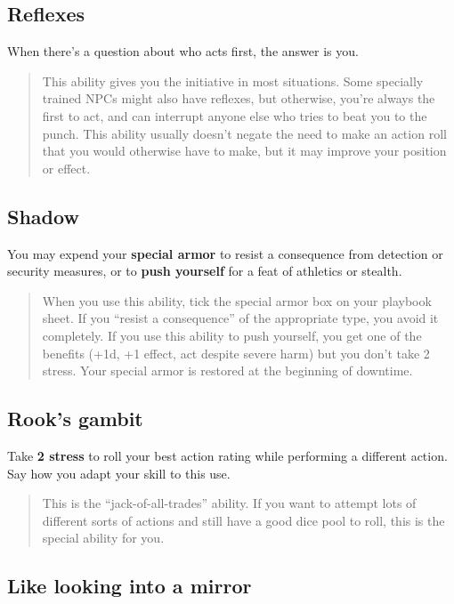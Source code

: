 \documentclass[11pt,oneside]{book}
\begin{document}
\subsection{Reflexes}

When there’s a question about who acts first, the answer is you.

\begin{quote}
	This ability gives you the initiative in most situations. Some specially trained NPCs might also have reflexes, but otherwise, you’re always the first to act, and can interrupt anyone else who tries to beat you to the punch. This ability usually doesn’t negate the need to make an action roll that you would otherwise have to make, but it may improve your position or effect.
\end{quote} 

\subsection{Shadow}

You may expend your \textbf{special armor} to resist a consequence from detection or security measures, or to \textbf{push yourself} for a feat of athletics or stealth.

\begin{quote}
	When you use this ability, tick the special armor box on your playbook sheet. If you “resist a consequence” of the appropriate type, you avoid it completely. If you use this ability to push yourself, you get one of the benefits (+1d, +1 effect, act despite severe harm) but you don’t take 2 stress. Your special armor is restored at the beginning of downtime.
\end{quote} 

\subsection{Rook’s gambit}

Take \textbf{2 stress} to roll your best action rating while performing a different action. Say how you adapt your skill to this use.

\begin{quote}
	This is the “jack-of-all-trades” ability. If you want to attempt lots of different sorts of actions and still have a good dice pool to roll, this is the special ability for you.
\end{quote} 

\subsection{Like looking into a mirror}
\end{document}
